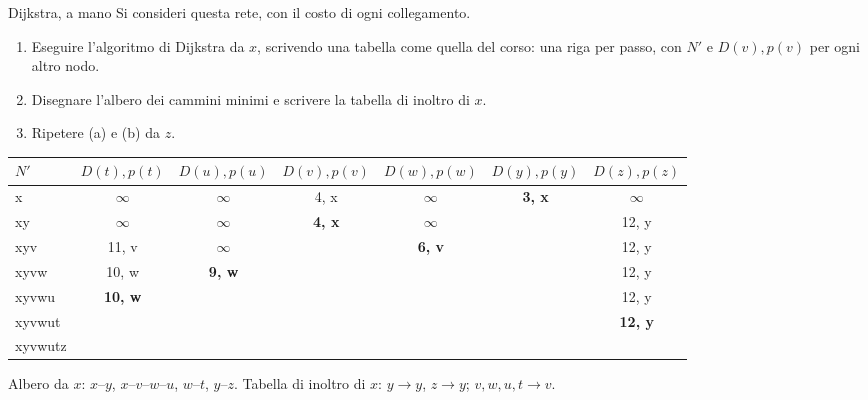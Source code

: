 \begin{esercizio}{Dijkstra, a mano}
Si consideri questa rete, con il costo di ogni collegamento.
\begin{center}
\end{center}
\begin{enumerate}[label=(\alph*)]
    \item Eseguire l'algoritmo di Dijkstra da $x$, scrivendo una tabella come quella del corso: una riga per passo, con $N'$ e $D(v), p(v)$
          per ogni altro nodo.
    \item Disegnare l'albero dei cammini minimi e scrivere la tabella di inoltro di $x$.
    \item Ripetere (a) e (b) da $z$.
\end{enumerate}

\svolgimento
\begin{center}
\small
\begin{tabular}{lcccccc}
\toprule
$N'$ & $D(t),p(t)$ & $D(u),p(u)$ & $D(v),p(v)$ & $D(w),p(w)$ & $D(y),p(y)$ & $D(z),p(z)$ \\
\midrule
x & $\infty$ & $\infty$ & 4, x & $\infty$ & \textbf{3, x} & $\infty$ \\
xy & $\infty$ & $\infty$ & \textbf{4, x} & $\infty$ & & 12, y \\
xyv & 11, v & $\infty$ & & \textbf{6, v} & & 12, y \\
xyvw & 10, w & \textbf{9, w} & & & & 12, y \\
xyvwu & \textbf{10, w} & & & & & 12, y \\
xyvwut & & & & & & \textbf{12, y} \\
xyvwutz & & & & & & \\
\bottomrule
\end{tabular}
\end{center}
Albero da $x$: $x$--$y$, $x$--$v$--$w$--$u$, $w$--$t$, $y$--$z$. Tabella di inoltro di $x$: $y \rightarrow y$, $z \rightarrow y$; $v, w, u,
t \rightarrow v$.


\end{esercizio}

